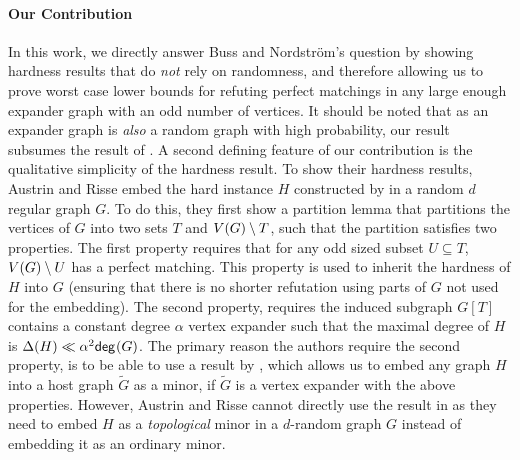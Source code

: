 \documentclass[11pt]{article}
\begin{document}
\paragraph{Our Contribution} In this work, we directly answer Buss and Nordstr{\"o}m's question by showing hardness results that do \emph{not} rely on randomness, and therefore allowing us to prove worst case lower bounds for refuting perfect matchings in any large enough expander graph with an odd number of vertices.
It should be noted that as an expander graph is \emph{also} a random graph with high probability, our result subsumes the result of \citet{Austrin_2022}.
A second defining feature of our contribution is the qualitative simplicity of the hardness result.
To show their hardness results, Austrin and Risse embed the hard instance $H$ constructed by \citet{buss1999linear} in a random $d$ regular graph $G$.
To do this, they first show a partition lemma that partitions the vertices of $G$ into two sets $T$ and $V(G) \setminus T$, such that the partition satisfies two properties.
The first property requires that for any odd sized subset $U \subseteq T$, $V(G) \setminus U$ has a perfect matching.
This property is used to inherit the hardness of $H$ into $G$ (ensuring that there is no shorter refutation using parts of $G$ not used for the embedding).
The second property, requires the induced subgraph $G[T]$ contains a constant degree $\alpha$ vertex expander such that the maximal degree of $H$ is $\Delta(H) \ll \alpha^2 \mathsf{deg}_{}(G)$.
The primary reason the authors require the second property, is to be able to use a result by \citet{krivelevich2019completeminorsgraphssparse}, which allows us to embed any graph $H$ into a host graph $\tilde{G}$ as a minor, if $\tilde{G}$ is a vertex expander with the above properties.
However, Austrin and Risse cannot directly use the result in \citep{krivelevich2019completeminorsgraphssparse} as they need to embed $H$ as a \emph{topological} minor in a $d$-random graph $G$ instead of embedding it as an ordinary minor.
\end{document}
